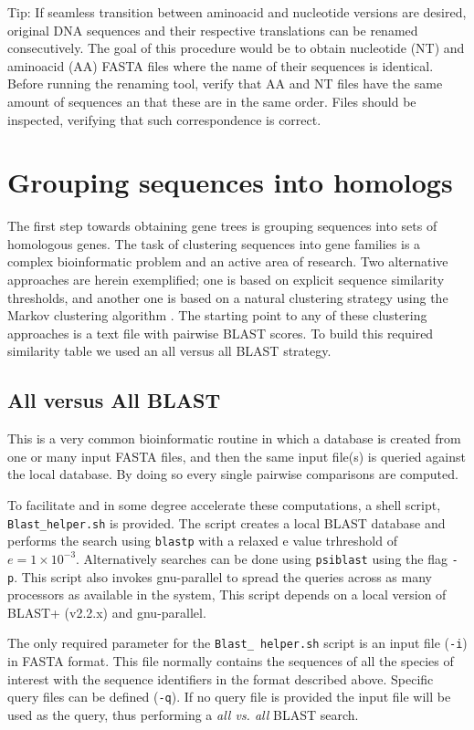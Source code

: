 \documentclass[10pt]{article}
\begin{document}
Tip: If seamless transition between aminoacid and nucleotide versions
are desired, original DNA sequences and their respective
translations can be renamed consecutively. The goal of this
procedure would be to obtain nucleotide (NT) and aminoacid (AA) FASTA
files where the name of their sequences is identical.  Before running
the renaming tool, verify that AA and NT files have the same amount of
sequences an that these are in the same order.  Files should be
inspected, verifying that such correspondence is correct.

\section{Grouping sequences into homologs} The first step towards
obtaining gene trees is grouping sequences into sets of homologous
genes. The task of clustering sequences into gene families is a
complex bioinformatic problem and an active area of research. Two alternative
approaches are herein exemplified; one is based on explicit sequence
similarity thresholds, and another one is based on a natural
clustering strategy using the Markov clustering algorithm
\citep{vanDongen2000, Enright2002}. The starting point to any of these clustering approaches is a text file with pairwise BLAST scores. To build this required
similarity table we used an all versus all BLAST strategy.

\subsection{All versus All BLAST} This is a very common bioinformatic
routine in which a database is created from one or many input FASTA
files, and then the same input file(s) is queried against the local
database. By doing so every single pairwise comparisons are computed.

To facilitate and in some degree accelerate these computations, a
shell script, \texttt{Blast\_helper.sh} is provided. The script
creates a local BLAST database and performs the search using
\texttt{blastp} with a relaxed e value trhreshold of $e = 1 \times
10^{-3}$. Alternatively searches can be done using \texttt{psiblast} using the flag \texttt{-p}. This script also invokes gnu-parallel to spread the queries
across as many processors as available in the system, This script
depends on a local version of BLAST+ (v2.2.x) and gnu-parallel.

The only required parameter for the \texttt{Blast\_ helper.sh} script is an input file (\texttt{-i}) in  FASTA format. This file normally contains the sequences of all the species of interest with the sequence identifiers in the format described above. Specific query files can be defined (\texttt{-q}). If no query file is provided the input file will be used as the query, thus performing a \emph{all vs. all} BLAST search.
\end{document}
